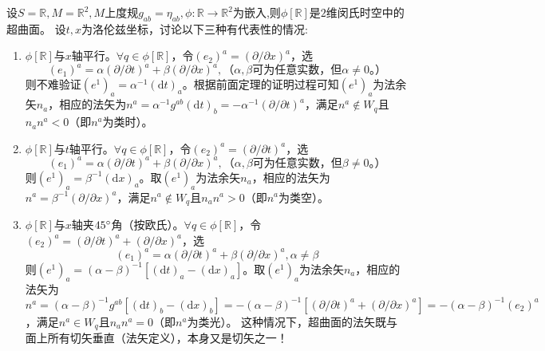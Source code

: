 \begin{example}
	设$S = \mathbb{R}, M = \mathbb{R}^2, M$上度规$g_{ab} = \eta_{ab}, \phi \colon \mathbb{R} \to \mathbb{R}^2$为嵌入,则$\phi[\mathbb{R}]$是$2$维闵氏时空中的超曲面。
	设$t, x$为洛伦兹坐标，讨论以下三种有代表性的情况:
	\begin{enumerate}[（1）]
		\item $\phi[\mathbb{R}]$与$x$轴平行。$\forall q \in \phi[\mathbb{R}]$，令$(e_2)^a = (\partial / \partial x)^a$，选
		$$(e_1)^a = \alpha(\partial / \partial t)^a + \beta(\partial / \partial x)^a, \text{（$\alpha, \beta$可为任意实数，但$\alpha \neq 0$。）}$$
		则不难验证$(e^1)_a = \alpha^{-1}(\mathrm{d}t)_a$。根据前面定理的证明过程可知$(e^1)_a$为法余矢$n_a$，相应的法矢为$n^a = \alpha^{-1}g^{ab}(\mathrm{d}t)_b = -\alpha^{-1}(\partial / \partial t)^a$，满足$n^a \notin W_q$且$n_an^a < 0$（即$n^a$为类时）。
		\item $\phi[\mathbb{R}]$与$t$轴平行。$\forall q \in \phi[\mathbb{R}]$，令$(e_2)^a = (\partial / \partial t)^a$，选
		$$(e_1)^a = \alpha(\partial / \partial t)^a + \beta(\partial / \partial x)^a, \text{（$\alpha, \beta$可为任意实数，但$\beta \neq 0$。）}$$
		则$(e^1)_a = \beta^{-1}(\mathrm{d}x)_a$。取$(e^1)_a$为法余矢$n_a$，相应的法矢为$n^a = \beta^{-1}(\partial / \partial x)^a$，满足$n^a \notin W_q$且$n_an^a > 0$（即$n^a$为类空）。
		\item $\phi[\mathbb{R}]$与$x$轴夹$45\degree$角（按欧氏）。$\forall q \in \phi[\mathbb{R}]$，令$(e_2)^a = (\partial / \partial t)^a + (\partial / \partial x)^a$，选
		$$(e_1)^a = \alpha(\partial / \partial t)^a + \beta(\partial / \partial x)^a, \alpha \neq \beta$$
		则$(e^1)_a = (\alpha - \beta)^{-1}[(\mathrm{d}t)_a - (\mathrm{d}x)_a]$。取$(e^1)_a$为法余矢$n_a$，相应的法矢为$n^a = (\alpha - \beta)^{-1}g^{ab}[(\mathrm{d}t)_b - (\mathrm{d}x)_b] = -(\alpha - \beta)^{-1}[(\partial / \partial t)^a + (\partial / \partial x)^a] = -(\alpha - \beta)^{-1}(e_2)^a$，满足$n^a \in W_q$且$n_an^a = 0$（即$n^a$为类光）。
		这种情况下，超曲面的法矢既与面上所有切矢垂直（法矢定义），本身又是切矢之一！
	\end{enumerate}
\end{example}
